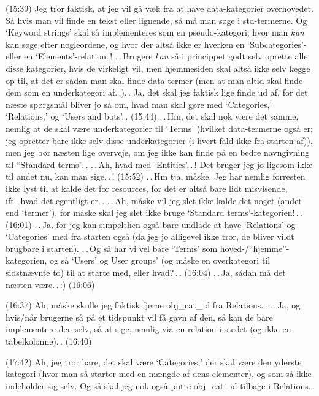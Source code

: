 \documentclass{report}
\begin{document}
(15:39) Jeg tror faktisk, at jeg vil gå væk fra at have data-kategorier overhovedet. Så hvis man vil finde en tekst eller lignende, så må man søge i std-termerne. Og `Keyword strings' skal så implementeres som en pseudo-kategori, hvor man \emph{kun} kan søge efter nøgleordene, og hvor der altså ikke er hverken en `Subcategories'- eller en `Elements'-relation.\,! .\,.\,Brugere \emph{kan} så i princippet godt selv oprette alle disse kategorier, hvis de virkeligt vil, men hjemmesiden skal altså ikke selv lægge op til, at det er sådan man skal finde data-termer (men at man altid skal finde dem som en underkategori af.\,.).\,. Ja, det skal jeg faktisk lige finde ud af, for det næste spørgsmål bliver jo så om, hvad man skal gøre med `Categories,' `Relations,' og `Users and bots'.\,. (15:44) .\,.\,Hm, det skal nok være det samme, nemlig at de skal være underkategorier til `Terms' (hvilket data-termerne også er; jeg opretter bare ikke selv disse underkategorier (i hvert fald ikke fra starten af)), men jeg bør næsten lige overveje, om jeg ikke kan finde på en bedre navngivning til ``Standard terms''.\,. .\,.\,Ah, hvad med `Entities'.\,.\,! Det bruger jeg jo ligesom ikke til andet nu, kan man sige.\,.\,! (15:52) .\,.\,Hm tja, måske. Jeg har nemlig forresten ikke lyst til at kalde det for resources, for det er altså bare lidt misvisende, ift.\ hvad det egentligt er.\,. .\,.\,Ah, måske vil jeg slet ikke kalde det noget (andet end `termer'), for måske skal jeg slet ikke bruge `Standard terms'-kategorien!\,.\,. (16:01) .\,.\,Ja, for jeg kan simpelthen også bare undlade at have `Relations' og `Categories' med fra starten også (da jeg jo alligevel ikke tror, de bliver vildt brugbare i starten). .\,.\,Og så har vi vel bare `Terms' som hoved-/``hjemme''-kategorien, og så `Users' og User groups' (og måske en overkategori til sidstnævnte to) til at starte med, eller hvad?\,.\,. (16:04) .\,.\,Ja, sådan må det næsten være.\,.\,:) (16:06)

(16:37) Ah, måske skulle jeg faktisk fjerne obj\_cat\_id fra Relations.\,. .\,.\,Ja, og hvis/når brugerne så på et tidspunkt vil få gavn af den, så kan de bare implementere den selv, så at sige, nemlig via en relation i stedet (og ikke en tabelkolonne).\,. (16:40)

(17:42) Ah, jeg tror bare, det skal være `Categories,' der skal være den yderste kategori (hvor man så starter med en mængde af dens elementer), og som så ikke indeholder sig selv. Og så skal jeg nok også putte obj\_cat\_id tilbage i Relations.\,. 
\end{document}
